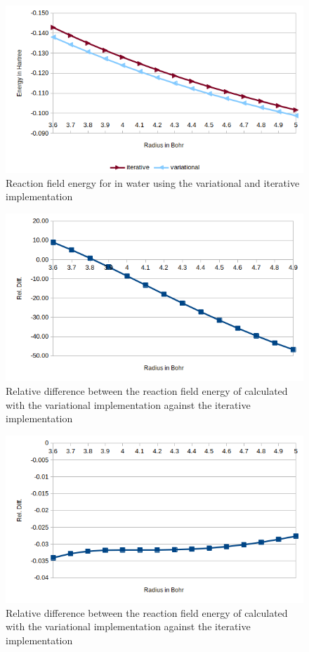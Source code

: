\documentclass[../Thesis.tex]{subfiles}
\begin{document}
\begin{figure}[!htb]
  \centering
  \includegraphics[width=0.75\linewidth]{img/lipvarEr.png}
  \caption{Reaction field energy for  in water using the variational and iterative implementation}
  \label{fig:lipvarEr}
\end{figure}

\begin{figure}[!htb]
  \centering
    \includegraphics[width=\linewidth]{img/watitervarreldiff.png}
  \caption{Relative difference between the reaction field energy of  calculated with the variational implementation against the iterative implementation}
  \label{fig:watreldiffvardaug}
\end{figure}

\begin{figure}[!htb]
  \centering
    \includegraphics[width=\linewidth]{img/lipitervarreldiff.png}
  \caption{Relative difference between the reaction field energy of  calculated with the variational implementation against the iterative implementation}
  \label{fig:lipreldiffvardaug}
\end{figure}
\clearpage
\end{document}
